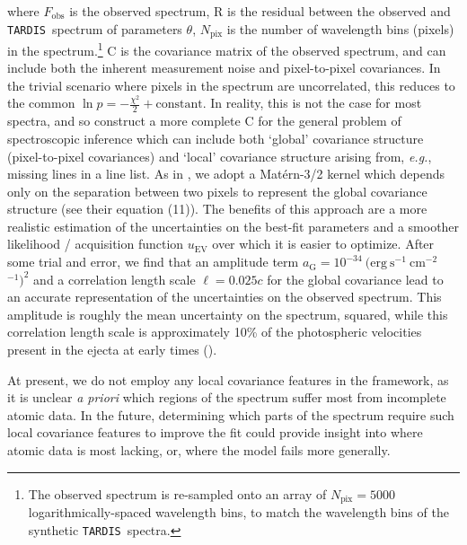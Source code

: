 \documentclass[twocolumn, twocolappendix]{aastex63}
\def\TARDIS{\texttt{TARDIS}}
\def\eg{{\it e.g.}}
\begin{document}
\noindent where $F_{\mathrm{obs}}$ is the observed spectrum, $\mathrm{R}$ is the residual between the observed and \TARDIS~spectrum of parameters $\theta$, $N_{\mathrm{pix}}$ is the number of wavelength bins (pixels) in the spectrum.\footnote{The observed spectrum is re-sampled onto an array of $N_{\mathrm{pix}} = 5000$ logarithmically-spaced wavelength bins, to match the wavelength bins of the synthetic \TARDIS~spectra.} $\mathrm{C}$ is the covariance matrix of the observed spectrum, and can include both the inherent measurement noise and pixel-to-pixel covariances. In the trivial scenario where pixels in the spectrum are uncorrelated, this reduces to the common $\ln p = -\frac{\chi^2}{2} + \mathrm{constant}$. In reality, this is not the case for most spectra, and so \cite{czekala15} construct a more complete $\mathrm{C}$ for the general problem of spectroscopic inference which can include both `global' covariance structure (pixel-to-pixel covariances) and `local' covariance structure arising from, \eg, missing lines in a line list. As in \cite{czekala15}, we adopt a Mat{\'e}rn-3/2 kernel which depends only on the separation between two pixels to represent the global covariance structure (see their equation (11)). The benefits of this approach are a more realistic estimation of the uncertainties on the best-fit parameters and a smoother likelihood / acquisition function $u_{\mathrm{EV}}$ over which it is easier to optimize. After some trial and error, we find that an amplitude term $a_{\mathrm{G}} = 10^{-34}~(\mathrm{erg~s^{-1}~cm^{-2}}$~\text{\AA}${}^{-1})^{2}$ and a correlation length scale $\ell = 0.025c$ for the global covariance lead to an accurate representation of the uncertainties on the observed spectrum. This amplitude is roughly the mean uncertainty on the spectrum, squared, while this correlation length scale is approximately 10\% of the photospheric velocities present in the ejecta at early times (\citealt{watson19}).

At present, we do not employ any local covariance features in the \cite{czekala15} framework, as it is unclear \textit{a priori} which regions of the spectrum suffer most from incomplete atomic data. In the future, determining which parts of the spectrum require such local covariance features to improve the fit could provide insight into where atomic data is most lacking, or, where the model fails more generally.




\end{document}
